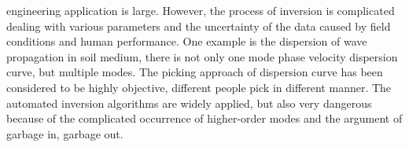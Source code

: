 engineering application is large. However, the process of inversion is complicated dealing with various parameters and the uncertainty of the data caused by field conditions and human performance. One example is the dispersion of wave propagation in soil medium, there is not only one mode phase velocity dispersion curve, but multiple modes. The picking approach of dispersion curve has been considered to be highly objective, different people pick in different manner. The automated inversion algorithms are widely applied, but also very dangerous because of the complicated occurrence of higher-order modes and the argument of garbage in, garbage out.